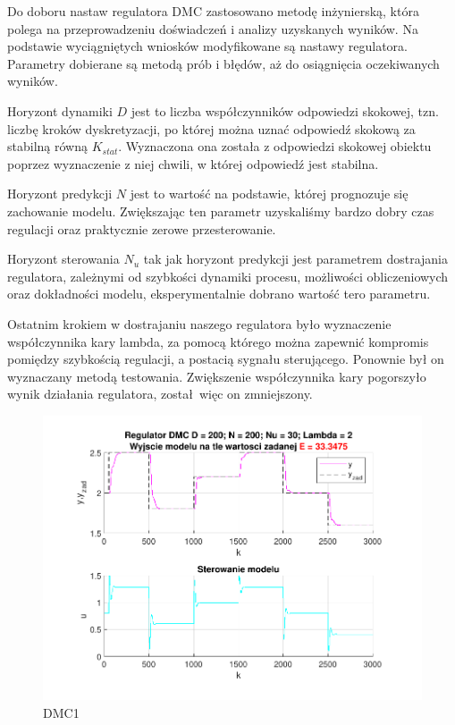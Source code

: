 Do doboru nastaw regulatora DMC zastosowano metodę inżynierską, 
która polega na przeprowadzeniu doświadczeń i analizy uzyskanych wyników. 
Na podstawie wyciągniętych wniosków modyfikowane są nastawy regulatora. 
Parametry  dobierane są metodą prób i błędów, aż do osiągnięcia oczekiwanych wyników.

\indent Horyzont dynamiki $D$ jest to liczba współczynników odpowiedzi skokowej, 
tzn. liczbę kroków dyskretyzacji, po której można uznać odpowiedź skokową za stabilną równą $K_{stat}$. 
Wyznaczona ona została z odpowiedzi skokowej obiektu poprzez wyznaczenie z niej chwili, 
w której odpowiedź jest stabilna.

\indent Horyzont predykcji $N$ jest to wartość na podstawie, 
której prognozuje się zachowanie modelu. 
Zwiększając ten parametr uzyskaliśmy bardzo dobry czas regulacji oraz praktycznie zerowe przesterowanie.

\indent Horyzont sterowania $N_{u}$ tak jak horyzont predykcji jest parametrem dostrajania regulatora, 
zależnymi od szybkości dynamiki procesu, możliwości obliczeniowych oraz dokładności modelu, 
eksperymentalnie dobrano wartość tero parametru.

Ostatnim krokiem w dostrajaniu naszego regulatora było wyznaczenie współczynnika kary lambda, 
za pomocą którego można zapewnić kompromis pomiędzy szybkością regulacji, a postacią sygnału sterującego. 
Ponownie był on wyznaczany metodą testowania. 
Zwiększenie współczynnika kary pogorszyło wynik działania regulatora, został więc on zmniejszony.


\begin{figure}[H]
    \centering
    \includegraphics[scale=0.90]{../projekt/zad4_5/DMC_pdf/DMC_1.pdf}
    \caption{DMC1}
\end{figure}

